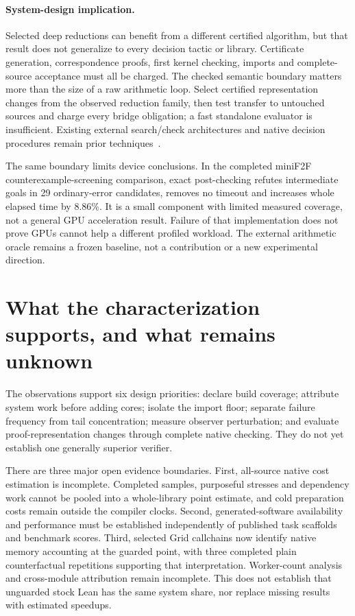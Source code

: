 \documentclass[10pt,twocolumn]{article}
\begin{document}
\paragraph{System-design implication.}
Selected deep reductions can benefit from a different certified algorithm,
but that result does not generalize to every decision tactic or library.
Certificate generation, correspondence proofs, first kernel checking,
imports and complete-source acceptance must all be charged.
The checked semantic boundary matters more than the size of a raw arithmetic
loop. Select certified representation changes from the observed reduction
family, then test transfer to untouched sources and charge every bridge
obligation; a fast standalone evaluator is insufficient.
Existing external search/check architectures and native decision
procedures remain prior techniques~\cite{mathlib,lean49DecideSource}.

The same boundary limits device conclusions.
In the completed miniF2F counterexample-screening comparison, exact
post-checking refutes intermediate goals in 29 ordinary-error candidates,
removes no timeout and increases whole elapsed time by 8.86\%.
It is a small component with limited measured coverage, not a general GPU
acceleration result. Failure of that implementation does not prove GPUs
cannot help a different profiled workload.
The external arithmetic oracle remains a frozen baseline, not a contribution
or a new experimental direction.

\section{What the characterization supports, and what remains unknown}
\label{sec:limits}
The observations support six design priorities: declare build coverage;
attribute system work before adding cores; isolate the import floor;
separate failure frequency from tail concentration; measure observer
perturbation; and evaluate proof-representation changes through complete
native checking. They do not yet establish one generally superior verifier.

There are three major open evidence boundaries.
First, all-source native cost estimation is incomplete. Completed samples,
purposeful stresses and dependency work cannot be pooled into a whole-library
point estimate, and cold preparation costs remain outside the compiler
clocks. Second, generated-software availability and performance must be
established independently of published task scaffolds and benchmark scores.
Third, selected Grid callchains now identify native memory accounting
at the guarded point, with three completed plain counterfactual
repetitions supporting that interpretation. Worker-count analysis and
cross-module attribution remain incomplete. This does not establish that unguarded stock Lean has
the same system share, nor replace missing results with estimated speedups.
\end{document}
